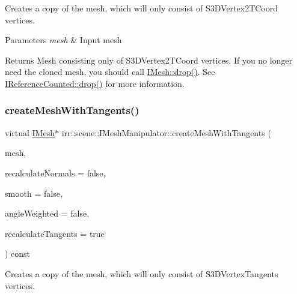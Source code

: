 Creates a copy of the mesh, which will only consist of S3\+D\+Vertex2\+T\+Coord vertices. 


\begin{DoxyParams}{Parameters}
{\em mesh} & Input mesh \\
\hline
\end{DoxyParams}
\begin{DoxyReturn}{Returns}
Mesh consisting only of S3\+D\+Vertex2\+T\+Coord vertices. If you no longer need the cloned mesh, you should call \hyperlink{classirr_1_1IReferenceCounted_a03856a09355b89d178090c4a5f738543}{I\+Mesh\+::drop()}. See \hyperlink{classirr_1_1IReferenceCounted_a03856a09355b89d178090c4a5f738543}{I\+Reference\+Counted\+::drop()} for more information. 
\end{DoxyReturn}
\mbox{\label{classirr_1_1scene_1_1IMeshManipulator_ab849bd2c83b206de1e5da19ce3481e35}} 
\subsubsection{\texorpdfstring{create\+Mesh\+With\+Tangents()}{createMeshWithTangents()}\hspace{0.1cm}{\footnotesize\ttfamily [1/2]}}
{\footnotesize\ttfamily virtual \hyperlink{classirr_1_1scene_1_1IMesh}{I\+Mesh}$\ast$ irr\+::scene\+::\+I\+Mesh\+Manipulator\+::create\+Mesh\+With\+Tangents (\begin{DoxyParamCaption}\item[{\hyperlink{classirr_1_1scene_1_1IMesh}{I\+Mesh} $\ast$}]{mesh,  }\item[{bool}]{recalculate\+Normals = {\ttfamily false},  }\item[{bool}]{smooth = {\ttfamily false},  }\item[{bool}]{angle\+Weighted = {\ttfamily false},  }\item[{bool}]{recalculate\+Tangents = {\ttfamily true} }\end{DoxyParamCaption}) const\hspace{0.3cm}{\ttfamily [pure virtual]}}



Creates a copy of the mesh, which will only consist of S3\+D\+Vertex\+Tangents vertices. 

